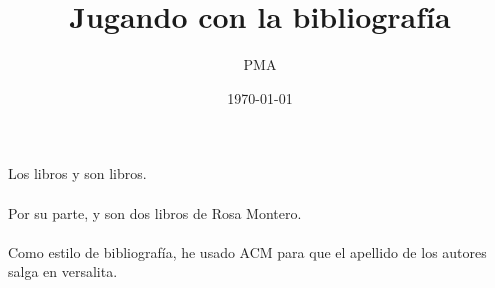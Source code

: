 \documentclass[12pt,a4paper]{article}
\begin{document}
	\title{Jugando con la bibliografía}
	\author{PMA}
	\date{\today}
	\maketitle
	

Los libros \cite{Cepeda2013} y \cite{Cisneros1984} son libros. \\ \\

Por su parte, \cite{Montero1988} y \cite{Montero2005} son dos libros de Rosa Montero. \\ \\

Como estilo de bibliografía, he usado ACM para que el apellido de los autores salga en versalita. 
	
	
\end{document}
